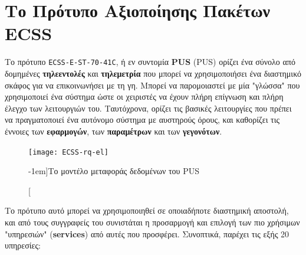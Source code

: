 \documentclass[a4paper,nobib]{tufte-book}
\begin{document}
\section{Το Πρότυπο Αξιοποίησης Πακέτων \acs{ECSS}}
\label{sec:pus}

Το πρότυπο \texttt{ECSS-E-ST-70-41C}, ή εν συντομία \textbf{\acs{PUS}} (\acl{PUS}) ορίζει ένα σύνολο από δομημένες \textbf{τηλεεντολές} και \textbf{τηλεμετρία} που μπορεί να χρησιμοποιήσει ένα διαστημικό σκάφος για να επικοινωνήσει με τη γη. Μπορεί να παρομοιαστεί με μία "γλώσσα" που χρησιμοποιεί ένα σύστημα ώστε οι χειριστές να έχουν πλήρη επίγνωση και πλήρη έλεγχο των λειτουργιών του. Ταυτόχρονα, ορίζει τις βασικές λειτουργίες που πρέπει να πραγματοποιεί ένα αυτόνομο σύστημα με αυστηρούς όρους, και καθορίζει τις έννοιες των \textbf{εφαρμογών}, των \textbf{παραμέτρων} και των \textbf{γεγονότων}.

\begin{figure}
	\texttt{[image: ECSS-rq-el]}
	\caption[][-1em]{Το μοντέλο μεταφοράς δεδομένων του \ac{PUS}}
	\label{fig:pusmodel}
\end{figure}

Το πρότυπο αυτό μπορεί να χρησιμοποιηθεί σε οποιαδήποτε διαστημική αποστολή, και από τους συγγραφείς του συνιστάται η προσαρμογή και επιλογή των πιο χρήσιμων "υπηρεσιών" (\textbf{services}) από αυτές που προσφέρει. Συνοπτικά, παρέχει τις εξής 20 υπηρεσίες: \autocite{ECSS-E-ST-70-41C,ECSS-E-70-41A,kaufeler_esa_standard_1994}

\end{document}

